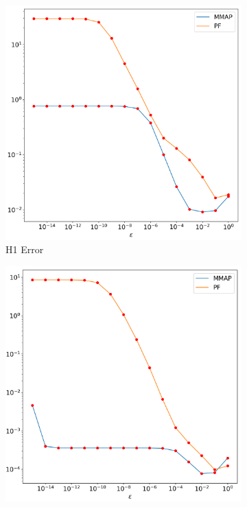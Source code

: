 \documentclass[12pt]{ociamthesis}
\begin{document}
\begin{figure}[H]
\begin{subfigure}{0.44\textwidth}
     \includegraphics[width=\textwidth]{Pics/LHSims/E2/E2_NormalH1.png}
     \caption{H1 Error}
 \end{subfigure}
 \begin{subfigure}{0.44\textwidth}
     \includegraphics[width=\textwidth]{Pics/LHSims/E2/E2_INL2.png}

\end{subfigure}
\end{figure}
\end{document}
